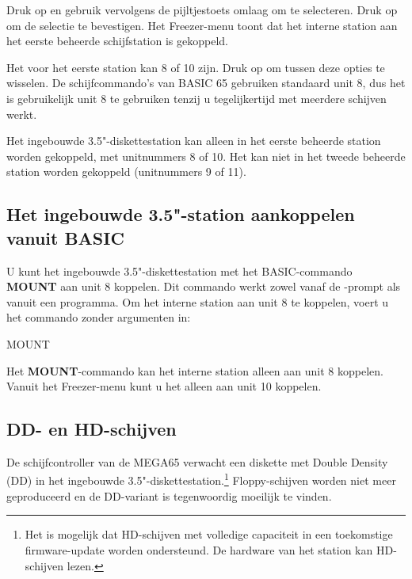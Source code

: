 Druk op  en gebruik vervolgens de pijltjestoets omlaag om  te selecteren. Druk op  om de selectie te bevestigen. Het Freezer-menu toont dat het interne station aan het eerste beheerde schijfstation is gekoppeld.

Het  voor het eerste station kan 8 of 10 zijn. Druk op  om tussen deze opties te wisselen. De schijfcommando's van BASIC 65 gebruiken standaard unit 8, dus het is gebruikelijk unit 8 te gebruiken tenzij u tegelijkertijd met meerdere schijven werkt.

Het ingebouwde 3.5"-diskettestation kan alleen in het eerste beheerde station worden gekoppeld, met unitnummers 8 of 10. Het kan niet in het tweede beheerde station worden gekoppeld (unitnummers 9 of 11).

\subsection{Het ingebouwde 3.5"-station aankoppelen vanuit BASIC}

U kunt het ingebouwde 3.5"-diskettestation met het BASIC-commando {\bf MOUNT} aan unit 8 koppelen. Dit commando werkt zowel vanaf de -prompt als vanuit een programma. Om het interne station aan unit 8 te koppelen, voert u het commando zonder argumenten in:

\begin{screencode}
MOUNT
\end{screencode}

Het {\bf MOUNT}-commando kan het interne station alleen aan unit 8 koppelen. Vanuit het Freezer-menu kunt u het alleen aan unit 10 koppelen.

\subsection{DD- en HD-schijven}

De schijfcontroller van de MEGA65 verwacht een diskette met Double Density (DD) in het ingebouwde 3.5"-diskettestation.\footnote{Het is mogelijk dat HD-schijven met volledige capaciteit in een toekomstige firmware-update worden ondersteund. De hardware van het station kan HD-schijven lezen.} Floppy-schijven worden niet meer geproduceerd en de DD-variant is tegenwoordig moeilijk te vinden.

